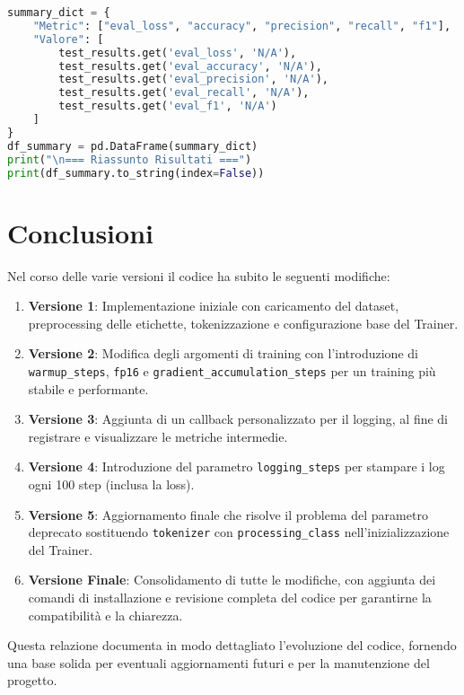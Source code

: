 \documentclass[a4paper,12pt]{article}
\begin{document}
\begin{lstlisting}[language=Python, caption={Versione Finale --- Codice Completo}]
summary_dict = {
    "Metric": ["eval_loss", "accuracy", "precision", "recall", "f1"],
    "Valore": [
        test_results.get('eval_loss', 'N/A'),
        test_results.get('eval_accuracy', 'N/A'),
        test_results.get('eval_precision', 'N/A'),
        test_results.get('eval_recall', 'N/A'),
        test_results.get('eval_f1', 'N/A')
    ]
}
df_summary = pd.DataFrame(summary_dict)
print("\n=== Riassunto Risultati ===")
print(df_summary.to_string(index=False))
\end{lstlisting}

\section{Conclusioni}
Nel corso delle varie versioni il codice ha subito le seguenti modifiche:
\begin{enumerate}
  \item \textbf{Versione 1}: Implementazione iniziale con caricamento del dataset, preprocessing delle etichette, tokenizzazione e configurazione base del Trainer.
  \item \textbf{Versione 2}: Modifica degli argomenti di training con l'introduzione di \texttt{warmup\_steps}, \texttt{fp16} e \texttt{gradient\_accumulation\_steps} per un training più stabile e performante.
  \item \textbf{Versione 3}: Aggiunta di un callback personalizzato per il logging, al fine di registrare e visualizzare le metriche intermedie.
  \item \textbf{Versione 4}: Introduzione del parametro \texttt{logging\_steps} per stampare i log ogni 100 step (inclusa la loss).
  \item \textbf{Versione 5}: Aggiornamento finale che risolve il problema del parametro deprecato sostituendo \texttt{tokenizer} con \texttt{processing\_class} nell'inizializzazione del Trainer.
  \item \textbf{Versione Finale}: Consolidamento di tutte le modifiche, con aggiunta dei comandi di installazione e revisione completa del codice per garantirne la compatibilità e la chiarezza.
\end{enumerate}

Questa relazione documenta in modo dettagliato l'evoluzione del codice, fornendo una base solida per eventuali aggiornamenti futuri e per la manutenzione del progetto.
\end{document}
